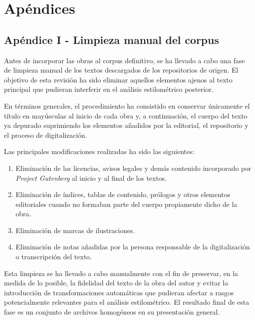 \documentclass[IB]{TFUOC}%
\begin{document}
\chapter*{Apéndices}

\section*{Apéndice I - Limpieza manual del corpus}
\label{apx:limpieza-manual}

Antes de incorporar las obras al corpus definitivo, se ha llevado a cabo una fase de limpieza manual de los textos descargados de los repositorios de origen. El objetivo de esta revisión ha sido eliminar aquellos elementos ajenos al texto principal que pudieran interferir en el análisis estilométrico posterior.

En términos generales, el procedimiento ha consistido en conservar únicamente el título en mayúsculas al inicio de cada obra y, a continuación, el cuerpo del texto ya depurado suprimiendo los elementos añadidos por la editorial, el repositorio y el proceso de digitalización.

Las principales modificaciones realizadas ha sido las siguientes:

\begin{enumerate}
    \item Eliminación de las licencias, avisos legales y demás contenido incorporado por \textit{Project Gutenberg} al inicio y al final de los textos.
    \item Eliminación de índices, tablas de contenido, prólogos y otros elementos editoriales cuando no formaban parte del cuerpo propiamente dicho de la obra.
    \item Eliminación de marcas de ilustraciones.
    \item Eliminación de notas añadidas por la persona responsable de la digitalización o transcripción del texto.
\end{enumerate}

Esta limpieza se ha llevado a cabo manualmente con el fin de preservar, en la medida de lo posible, la fidelidad del texto de la obra del autor y evitar la introducción de transformaciones automáticas que pudieran afectar a rasgos potencialmente relevantes para el análisis estilométrico. El resultado final de esta fase es un conjunto de archivos homogéneos en su presentación general.
\end{document}
